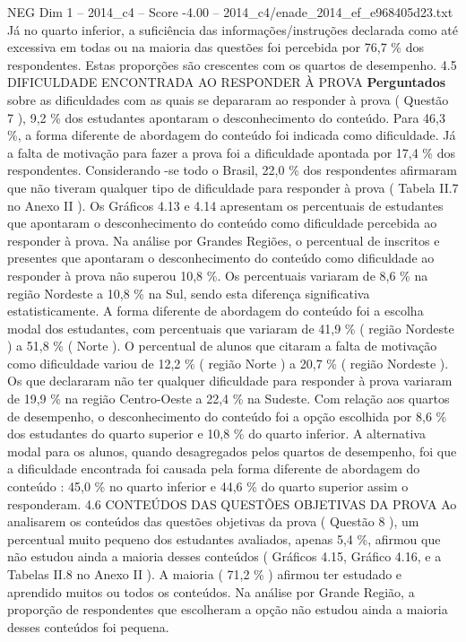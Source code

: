 \begin{textsample}{NEG Dim 1 – 2014\_c4 – Score -4.00 – 2014\_c4/enade\_2014\_ef\_e968405d23.txt}
Já no quarto inferior, a suficiência das informações/instruções declarada como até excessiva em todas ou na maioria das questões foi percebida por 76,7 \% dos respondentes.
Estas proporções são crescentes com os quartos de desempenho. 4.5 DIFICULDADE ENCONTRADA AO RESPONDER À PROVA \textbf{Perguntados} sobre as dificuldades com as quais se depararam ao responder à prova ( Questão 7 ), 9,2 \% dos estudantes apontaram o desconhecimento do conteúdo.
Para 46,3 \%, a forma diferente de abordagem do conteúdo foi indicada como dificuldade.
Já a falta de motivação para fazer a prova foi a dificuldade apontada por 17,4 \% dos respondentes.
Considerando -se todo o Brasil, 22,0 \% dos respondentes afirmaram que não tiveram qualquer tipo de dificuldade para responder à prova ( Tabela II.7 no Anexo II ).
Os Gráficos 4.13 e 4.14 apresentam os percentuais de estudantes que apontaram o desconhecimento do conteúdo como dificuldade percebida ao responder à prova.
Na análise por Grandes Regiões, o percentual de inscritos e presentes que apontaram o desconhecimento do conteúdo como dificuldade ao responder à prova não superou 10,8 \%.
Os percentuais variaram de 8,6 \% na região Nordeste a 10,8 \% na Sul, sendo esta diferença significativa estatisticamente.
A forma diferente de abordagem do conteúdo foi a escolha modal dos estudantes, com percentuais que variaram de 41,9 \% ( região Nordeste ) a 51,8 \% ( Norte ).
O percentual de alunos que citaram a falta de motivação como dificuldade variou de 12,2 \% ( região Norte ) a 20,7 \% ( região Nordeste ).
Os que declararam não ter qualquer dificuldade para responder à prova variaram de 19,9 \% na região Centro-Oeste a 22,4 \% na Sudeste.
Com relação aos quartos de desempenho, o desconhecimento do conteúdo foi a opção escolhida por 8,6 \% dos estudantes do quarto superior e 10,8 \% do quarto inferior.
A alternativa modal para os alunos, quando desagregados pelos quartos de desempenho, foi que a dificuldade encontrada foi causada pela forma diferente de abordagem do conteúdo : 45,0 \% no quarto inferior e 44,6 \% do quarto superior assim o responderam. 4.6 CONTEÚDOS DAS QUESTÕES OBJETIVAS DA PROVA Ao analisarem os conteúdos das questões objetivas da prova ( Questão 8 ), um percentual muito pequeno dos estudantes avaliados, apenas 5,4 \%, afirmou que não estudou ainda a maioria desses conteúdos ( Gráficos 4.15, Gráfico 4.16, e a Tabelas II.8 no Anexo II ).
A maioria ( 71,2 \% ) afirmou ter estudado e aprendido muitos ou todos os conteúdos.
Na análise por Grande Região, a proporção de respondentes que escolheram a opção não estudou ainda a maioria desses conteúdos foi pequena.

\end{textsample}

